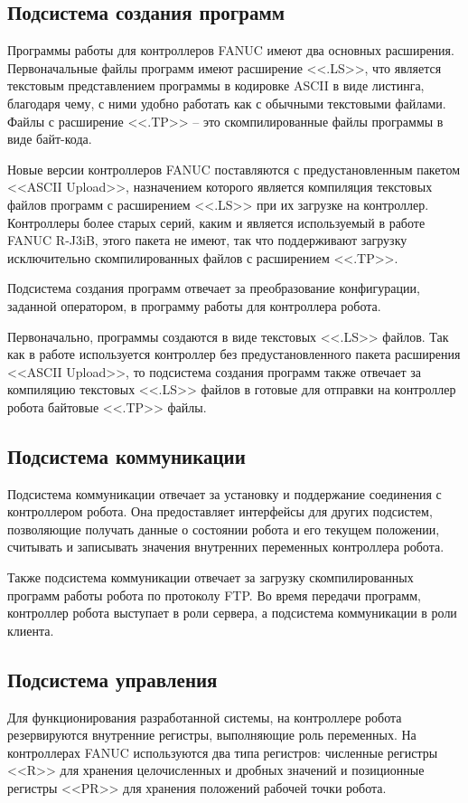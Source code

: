 \subsection{Подсистема создания программ}
Программы работы для контроллеров FANUC имеют два основных расширения.
Первоначальные файлы программ имеют расширение <<.LS>>, что является текстовым представлением программы в кодировке ASCII в виде листинга, благодаря чему, с ними удобно работать как с обычными текстовыми файлами.
Файлы с расширение <<.TP>> -- это скомпилированные файлы программы в виде байт-кода.

Новые версии контроллеров FANUC поставляются с предустановленным пакетом <<ASCII Upload>>, назначением которого является компиляция текстовых файлов программ с расширением <<.LS>> при их загрузке на контроллер.
Контроллеры более старых серий, каким и является используемый в работе FANUC R-J3iB, этого пакета не имеют, так что поддерживают загрузку исключительно скомпилированных файлов с расширением <<.TP>>.

Подсистема создания программ отвечает за преобразование конфигурации, заданной оператором, в программу работы для контроллера робота.

Первоначально, программы создаются в виде текстовых <<.LS>> файлов.
Так как в работе используется контроллер без предустановленного пакета расширения <<ASCII Upload>>, то подсистема создания программ также отвечает за компиляцию текстовых <<.LS>> файлов в готовые для отправки на контроллер робота байтовые <<.TP>> файлы.

\subsection{Подсистема коммуникации}
Подсистема коммуникации отвечает за установку и поддержание соединения с контроллером робота.
Она предоставляет интерфейсы для других подсистем, позволяющие получать данные о состоянии робота и его текущем положении, считывать и записывать значения внутренних переменных контроллера робота.

Также подсистема коммуникации отвечает за загрузку скомпилированных программ работы робота по протоколу FTP.
Во время передачи программ, контроллер робота выступает в роли сервера, а подсистема коммуникации в роли клиента.

\subsection{Подсистема управления}
Для функционирования разработанной системы, на контроллере робота резервируются внутренние регистры, выполняющие роль переменных.
На контроллерах FANUC используются два типа регистров: численные регистры <<R>> для хранения целочисленных и дробных значений и позиционные регистры <<PR>> для хранения положений рабочей точки робота.

